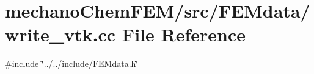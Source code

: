 \section{mechano\+Chem\+F\+E\+M/src/\+F\+E\+Mdata/write\+\_\+vtk.cc File Reference}
\label{write__vtk_8cc}
{\ttfamily \#include \char`\"{}../../include/\+F\+E\+Mdata.\+h\char`\"{}}\newline
